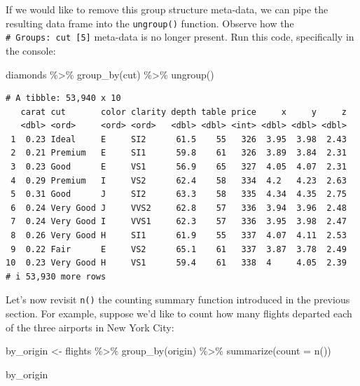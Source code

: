 \documentclass[
  letterpaper,
  DIV=11,
  numbers=noendperiod]{scrreprt}
\newenvironment{Shaded}{\begin{snugshade}}{\end{snugshade}}
\newcommand{\AttributeTok}[1]{\textcolor[rgb]{0.40,0.45,0.13}{#1}}
\newcommand{\FunctionTok}[1]{\textcolor[rgb]{0.28,0.35,0.67}{#1}}
\newcommand{\NormalTok}[1]{\textcolor[rgb]{0.00,0.23,0.31}{#1}}
\newcommand{\OtherTok}[1]{\textcolor[rgb]{0.00,0.23,0.31}{#1}}
\newcommand{\SpecialCharTok}[1]{\textcolor[rgb]{0.37,0.37,0.37}{#1}}
\theoremstyle{definition}
\theoremstyle{remark}
\begin{document}
If we would like to remove this group structure meta-data, we can pipe
the resulting data frame into the \texttt{ungroup()} function. Observe
how the \texttt{\#\ Groups:\ cut\ {[}5{]}} meta-data is no longer
present. Run this code, specifically in the console:

\begin{Shaded}
\begin{Highlighting}[]
\NormalTok{diamonds }\SpecialCharTok{\%\textgreater{}\%} 
  \FunctionTok{group\_by}\NormalTok{(cut) }\SpecialCharTok{\%\textgreater{}\%} 
  \FunctionTok{ungroup}\NormalTok{()}
\end{Highlighting}
\end{Shaded}

\begin{verbatim}
# A tibble: 53,940 x 10
   carat cut       color clarity depth table price     x     y     z
   <dbl> <ord>     <ord> <ord>   <dbl> <dbl> <int> <dbl> <dbl> <dbl>
 1  0.23 Ideal     E     SI2      61.5    55   326  3.95  3.98  2.43
 2  0.21 Premium   E     SI1      59.8    61   326  3.89  3.84  2.31
 3  0.23 Good      E     VS1      56.9    65   327  4.05  4.07  2.31
 4  0.29 Premium   I     VS2      62.4    58   334  4.2   4.23  2.63
 5  0.31 Good      J     SI2      63.3    58   335  4.34  4.35  2.75
 6  0.24 Very Good J     VVS2     62.8    57   336  3.94  3.96  2.48
 7  0.24 Very Good I     VVS1     62.3    57   336  3.95  3.98  2.47
 8  0.26 Very Good H     SI1      61.9    55   337  4.07  4.11  2.53
 9  0.22 Fair      E     VS2      65.1    61   337  3.87  3.78  2.49
10  0.23 Very Good H     VS1      59.4    61   338  4     4.05  2.39
# i 53,930 more rows
\end{verbatim}

Let's now revisit \texttt{n()} the counting summary function introduced
in the previous section. For example, suppose we'd like to count how
many flights departed each of the three airports in New York City:

\begin{Shaded}
\begin{Highlighting}[]
\NormalTok{by\_origin }\OtherTok{\textless{}{-}}\NormalTok{ flights }\SpecialCharTok{\%\textgreater{}\%} 
  \FunctionTok{group\_by}\NormalTok{(origin) }\SpecialCharTok{\%\textgreater{}\%} 
  \FunctionTok{summarize}\NormalTok{(}\AttributeTok{count =} \FunctionTok{n}\NormalTok{())}

\NormalTok{by\_origin}
\end{Highlighting}
\end{Shaded}
\end{document}
